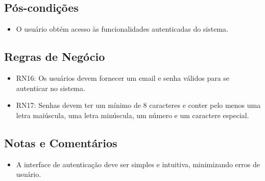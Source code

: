 \subsection*{Pós-condições}
\begin{addmargin}[1.5cm]{0cm}
	\begin{itemize}
		\item O usuário obtém acesso às funcionalidades autenticadas do sistema.
	\end{itemize}
\end{addmargin}

\subsection*{Regras de Negócio}
\begin{addmargin}[1.5cm]{0cm}
	\begin{itemize}
		\item RN16: Os usuários devem fornecer um email e senha válidos para se autenticar no sistema.
		\item RN17: Senhas devem ter um mínimo de 8 caracteres e conter pelo menos uma letra maiúscula, uma letra minúscula, um número e um caractere especial.
	\end{itemize}
\end{addmargin}

\subsection*{Notas e Comentários}
\begin{addmargin}[1.5cm]{0cm}
	\begin{itemize}
		\item A interface de autenticação deve ser simples e intuitiva, minimizando erros de usuário.
	\end{itemize}
\end{addmargin}